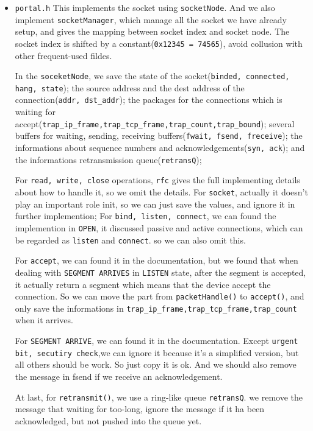 \documentclass[11pt]{article}
\begin{document}
\begin{itemize}
			\item \texttt{portal.h} This implements the socket using \texttt{socketNode}. And we also implement \texttt{socketManager}, which manage all the socket we have already setup, and gives the mapping between socket index and socket node. The socket index is shifted by a constant(\texttt{0x12345 = 74565}), avoid collusion with other frequent-used fildes.
			
			In the \texttt{soceketNode}, we save the state of the socket(\texttt{binded, connected, hang, state}); the source address and the dest address of the connection(\texttt{addr, dst\_addr}); the packages for the connections which is waiting for accept(\texttt{trap\_ip\_frame,trap\_tcp\_frame,trap\_count,trap\_bound}); several buffers for waiting, sending, receiving buffers(\texttt{fwait, fsend, freceive}); the informations about sequence numbers and acknowledgements(\texttt{syn, ack}); and the informations retransmission queue(\texttt{retransQ});
			
			For \texttt{read, write, close} operations, \texttt{rfc} gives the full implementing details about how to handle it, so we omit the details. For \texttt{socket}, actually it doesn't play an important role init, so we can just save the values, and ignore it in further implemention; For \texttt{bind, listen, connect}, we can found the implemention in \texttt{OPEN}, it discussed passive and active connections, which can be regarded as \texttt{listen} and \texttt{connect}. so we can also omit this.
			
			For \texttt{accept}, we can found it in the documentation, but we found that when dealing with \texttt{SEGMENT ARRIVES} in \texttt{LISTEN} state, after the segment is accepted, it actually return a segment which means that the device accept the connection. So we can move the part from \texttt{packetHandle()} to \texttt{accept()}, and only save the informations in \texttt{trap\_ip\_frame,trap\_tcp\_frame,trap\_count} when it arrives.
				
			For \texttt{SEGMENT ARRIVE}, we can found it in the documentation. Except \texttt{urgent bit, secutiry check},we can ignore it because it's a simplified version, but all others should be work. So just copy it is ok. And we should also remove the message in fsend if we receive an acknowledgement.
			
			At last, for \texttt{retransmit()}, we use a ring-like queue \texttt{retransQ}. we remove the message that waiting for too-long, ignore the message if it ha been acknowledged, but not pushed into the queue yet.
			

\end{itemize}
\end{document}
